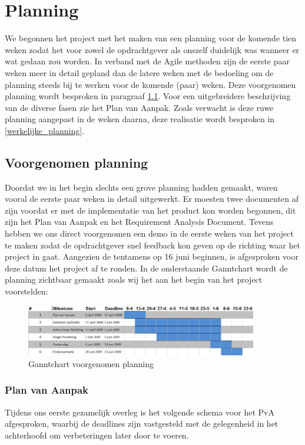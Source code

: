 \section{Planning}
\label{Planning}
We begonnen het project met het maken van een planning voor de komende tien
weken zodat het voor zowel de opdrachtgever als onszelf duidelijk was wanneer
er wat gedaan zou worden. In verband met de Agile methoden zijn de eerste paar
weken meer in detail gepland dan de latere weken met de bedoeling om de
planning steeds bij te werken voor de komende (paar) weken. Deze voorgenomen
planning wordt besproken in paragraaf \ref{voorgenomen_planning}. Voor een
uitgebreidere beschrijving van de diverse fasen zie het Plan van Aanpak.
Zoals verwacht is deze ruwe planning aangepast in de
weken daarna, deze realisatie wordt besproken in \ref{werkelijke_planning}.

\subsection{Voorgenomen planning}
\label{voorgenomen_planning}
Doordat we in het begin slechts een grove planning hadden gemaakt, waren vooral
de eerste paar weken in detail uitgewerkt.
Er moesten twee documenten af zijn voordat er met de implementatie van het product kon worden begonnen, dit zijn het Plan van Aanpak en het Requirement Analysis Document.
Tevens hebben we ons direct voorgenomen een demo in de eerste weken van het project te maken zodat de opdrachtgever snel feedback kon geven op de richting waar het project in gaat.
Aangezien de tentamens op 16 juni beginnen, is afgesproken voor deze datum het project af te ronden.
In de onderstaande Ganntchart wordt de planning zichtbaar gemaakt zoals wij het aan het begin van het project voorstelden:
\\
\begin{figure}[ht]
\includegraphics[width=0.9\textwidth]{ganntbefore}
\caption{Ganntchart voorgenomen planning}
\label{fig:ganntbefore}
\end{figure}

\subsubsection{Plan van Aanpak}
Tijdens ons eerste gezamelijk overleg is het volgende schema voor het PvA
afgesproken, waarbij de deadlines zijn vastgesteld met de gelegenheid in het achterhoofd om verbeteringen later door te voeren.

